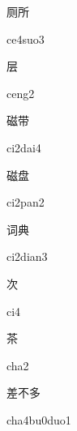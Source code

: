 \begin{multicols*}{2}
\begin{verbete}[ce4suo3]{厕所}
\begin{pronuncia}{ce4suo3}
\end{pronuncia}
\end{verbete}

\begin{verbete}[ceng2]{层}
\begin{pronuncia}{ceng2}
\end{pronuncia}
\end{verbete}

\begin{verbete}[ci2dai4]{磁带}
\begin{pronuncia}{ci2dai4}
\end{pronuncia}
\end{verbete}

\begin{verbete}[ci2pan2]{磁盘}
\begin{pronuncia}{ci2pan2}
\end{pronuncia}
\end{verbete}

\begin{verbete}[ci2dian3]{词典}
\begin{pronuncia}{ci2dian3}
\end{pronuncia}
\end{verbete}

\begin{verbete}[ci4]{次}
\begin{pronuncia}{ci4}
\end{pronuncia}
\end{verbete}

\begin{verbete}[cha2]{茶}
\begin{pronuncia}{cha2}
\end{pronuncia}
\end{verbete}

\begin{verbete}{差不多}
\begin{pronuncia}{cha4bu0duo1}
\end{pronuncia}
\end{verbete}


\end{multicols*}
